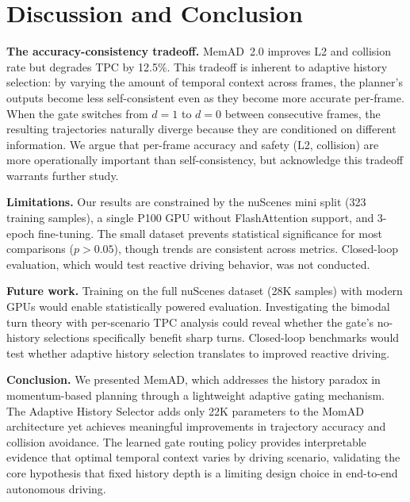 \documentclass{article}
\begin{document}
\section{Discussion and Conclusion}
\label{sec:conclusion}

\textbf{The accuracy-consistency tradeoff.}
MemAD~2.0 improves L2 and collision rate but degrades TPC by 12.5\%.
This tradeoff is inherent to adaptive history selection: by varying the amount of temporal context across frames, the planner's outputs become less self-consistent even as they become more accurate per-frame.
When the gate switches from $d{=}1$ to $d{=}0$ between consecutive frames, the resulting trajectories naturally diverge because they are conditioned on different information.
We argue that per-frame accuracy and safety (L2, collision) are more operationally important than self-consistency, but acknowledge this tradeoff warrants further study.

\textbf{Limitations.}
Our results are constrained by the nuScenes mini split (323 training samples), a single P100 GPU without FlashAttention support, and 3-epoch fine-tuning.
The small dataset prevents statistical significance for most comparisons ($p > 0.05$), though trends are consistent across metrics.
Closed-loop evaluation, which would test reactive driving behavior, was not conducted.

\textbf{Future work.}
Training on the full nuScenes dataset (28K samples) with modern GPUs would enable statistically powered evaluation.
Investigating the bimodal turn theory with per-scenario TPC analysis could reveal whether the gate's no-history selections specifically benefit sharp turns.
Closed-loop benchmarks would test whether adaptive history selection translates to improved reactive driving.

\textbf{Conclusion.}
We presented MemAD, which addresses the history paradox in momentum-based planning through a lightweight adaptive gating mechanism.
The Adaptive History Selector adds only 22K parameters to the MomAD architecture yet achieves meaningful improvements in trajectory accuracy and collision avoidance.
The learned gate routing policy provides interpretable evidence that optimal temporal context varies by driving scenario, validating the core hypothesis that fixed history depth is a limiting design choice in end-to-end autonomous driving.



\end{document}
